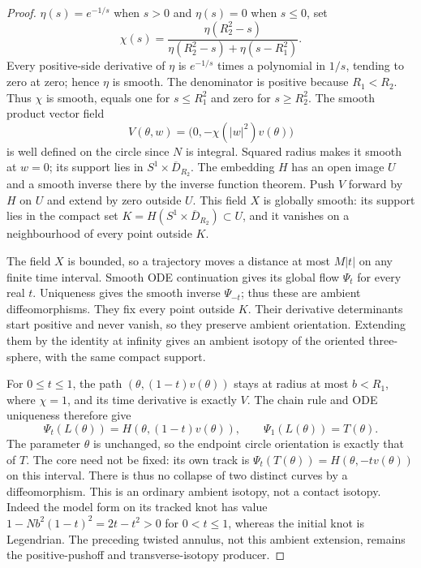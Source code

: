 \begin{proof}
$\eta(s)=e^{-1/s}$ when $s>0$ and $\eta(s)=0$ when $s\leq0$, set
\begin{equation}
 \chi(s)=\frac{\eta(R_2^2-s)}
 {\eta(R_2^2-s)+\eta(s-R_1^2)}.
\end{equation}
Every positive-side derivative of $\eta$ is $e^{-1/s}$ times a
polynomial in $1/s$, tending to zero at zero; hence $\eta$ is smooth.
The denominator is positive because $R_1<R_2$. Thus $\chi$ is smooth,
equals one for $s\leq R_1^2$ and zero for $s\geq R_2^2$.
The smooth product vector field
\begin{equation}
 V(\theta,w)=\bigl(0,-\chi(|w|^2)v(\theta)\bigr)
\end{equation}
is well defined on the circle since $N$ is integral. Squared radius
makes it smooth at $w=0$; its support lies in
$S^1\times\overline D_{R_2}$. The embedding $H$ has an open image
$U$ and a smooth inverse there by the inverse function theorem.
Push $V$ forward by $H$ on $U$ and extend by zero outside $U$.
This field $X$ is globally smooth: its support lies in the compact
set $K=H(S^1\times\overline D_{R_2})\subset U$, and it vanishes
on a neighbourhood of every point outside $K$.

The field $X$ is bounded, so a trajectory moves a distance at most
$M|t|$ on any finite time interval. Smooth ODE continuation gives
its global flow $\Psi_t$ for every real $t$. Uniqueness gives the
smooth inverse $\Psi_{-t}$; thus these are ambient diffeomorphisms.
They fix every point outside $K$. Their derivative determinants
start positive and never vanish, so they preserve ambient orientation.
Extending them by the identity at infinity gives an ambient isotopy
of the oriented three-sphere, with the same compact support.

For $0\leq t\leq1$, the path $(\theta,(1-t)v(\theta))$ stays
at radius at most $b<R_1$, where $\chi=1$, and its time derivative
is exactly $V$. The chain rule and ODE uniqueness therefore give
\begin{equation}\label{fd:helix-ambient-isotopy}
 \Psi_t(L(\theta))=H(\theta,(1-t)v(\theta)),\qquad
 \Psi_1(L(\theta))=T(\theta).
\end{equation}
The parameter $\theta$ is unchanged, so the endpoint circle orientation
is exactly that of $T$. The core need not be fixed: its own track is
$\Psi_t(T(\theta))=H(\theta,-t v(\theta))$ on this interval.
There is thus no collapse of two distinct curves by a diffeomorphism.
This is an ordinary ambient isotopy, not a contact isotopy. Indeed
the model form on its tracked knot has value
$1-Nb^2(1-t)^2=2t-t^2>0$ for $0<t\leq1$, whereas the initial
knot is Legendrian. The preceding twisted annulus, not this ambient
extension, remains the positive-pushoff and transverse-isotopy producer.
\end{proof}

